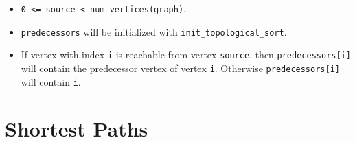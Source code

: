 {\small
      
}


\begin{itemdescr}
      \pnum\preconditions
            \begin{itemize}
                  \item
                        \lstinline{0 <= source < num_vertices(graph)}. 
                  \item
                        \lstinline{predecessors} will be initialized with \lstinline{init_topological_sort}.
            \end{itemize}
      \pnum\effects
            \begin{itemize}
                  \item
                        If vertex with index \lstinline{i} is reachable
                        from vertex \lstinline{source}, then \lstinline{predecessors[i]} will contain the
                        predecessor vertex of vertex \lstinline{i}. Otherwise \lstinline{predecessors[i]} will contain
                        \lstinline{i}.
            \end{itemize}
\end{itemdescr}



\section{Shortest Paths}

